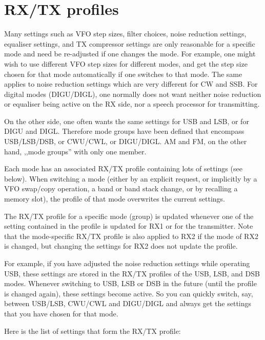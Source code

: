 \documentclass[12pt]{book}
\begin{document}
\section{RX/TX profiles}
\label{sec:rxtxprofiles}
Many settings such as VFO step sizes, filter choices, noise reduction
settings, equaliser settings, and TX compressor settings
are only reasonable for a specific mode and need be re-adjusted if one changes
the mode. For example, one might wish to use
different VFO step sizes for different modes, and get the step size chosen for that
mode automatically if one switches to that mode. The same applies to noise reduction
settings which are very different for CW and SSB. For digital modes (DIGU/DIGL),
one normally does not want neither noise reduction or equaliser being active on the RX
side, nor a speech processor for transmitting.

On the other side, one often wants the same settings for USB and LSB, or for DIGU and DIGL.
Therefore mode groups have been defined that encompass USB/LSB/DSB, or CWU/CWL, or
DIGU/DIGL. AM and FM, on the other hand, ,,mode groups'' with only one member.

Each mode  has an associated RX/TX profile containing lots of settings (see below).
When switching a mode (either by an explicit request, or implicitly by a VFO swap/copy
operation, a band or band stack change, or by recalling a memory slot), the profile of
that mode overwrites the current settings.

The RX/TX profile for a specific mode (group) is updated whenever one of the setting
contained in the profile is updated for RX1 or for the transmitter. Note that the
mode-specific RX/TX profile is also applied to RX2 if the mode of RX2 is changed,
but changing the settings for RX2 does not update the profile.

For example, if you have adjusted the noise reduction settings while operating USB,
these settings are stored in the RX/TX profiles of the USB, LSB, and DSB modes. Whenever
switching to USB, LSB or DSB in the future (until the profile is changed again), these
settings become active. So you can quickly switch, say, between USB/LSB, CWU/CWL and
DIGU/DIGL and always get the settings that you have chosen for that mode.

Here is the list of settings that form the RX/TX profile:
\end{document}
